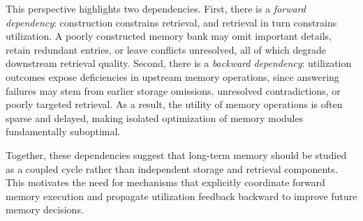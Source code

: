 This perspective highlights two dependencies. First, there is a \emph{forward dependency}: construction constrains retrieval, and retrieval in turn constrains utilization.
A poorly constructed memory bank may omit important details, retain redundant entries, or leave conflicts unresolved, all of which degrade downstream retrieval quality. 
Second, there is a \emph{backward dependency}: utilization outcomes expose deficiencies in upstream memory operations, since answering failures may stem from earlier storage omissions, unresolved contradictions, or poorly targeted retrieval. 
As a result, the utility of memory operations is often sparse and delayed, making isolated optimization of memory modules fundamentally suboptimal.

Together, these dependencies suggest that long-term memory should be studied as a coupled cycle rather than independent storage and retrieval components.
This motivates the need for mechanisms that explicitly coordinate forward memory execution and propagate utilization feedback backward to improve future memory decisions.




\begin{table}[t]
\centering

\caption{Preliminary analysis results (\%) in LoCoMo dataset, GPT-4o-mini is the backbone LLM. 
} 
\label{tab:prior_study}
\end{table}


